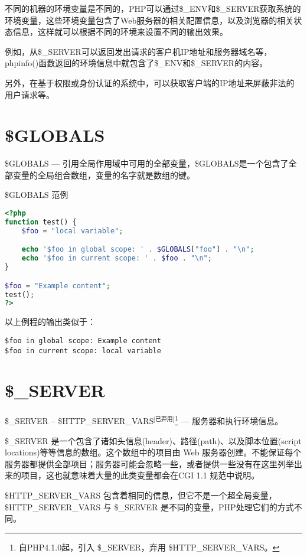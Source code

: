 不同的机器的环境变量是不同的，PHP可以通过\$\_ENV和\$\_SERVER获取系统的环境变量，这些环境变量包含了Web服务器的相关配置信息，以及浏览器的相关状态信息，这样就可以根据不同的环境来设置不同的输出效果。

例如，从\$\_SERVER可以返回发出请求的客户机IP地址和服务器域名等，phpinfo()函数返回的环境信息中就包含了\$\_ENV和\$\_SERVER的内容。


另外，在基于权限或身份认证的系统中，可以获取客户端的IP地址来屏蔽非法的用户请求等。




\section{\$GLOBALS}

\$GLOBALS — 引用全局作用域中可用的全部变量，\$GLOBALS是一个包含了全部变量的全局组合数组，变量的名字就是数组的键。


\begin{example}
\$GLOBALS 范例
\begin{lstlisting}[language=PHP]
<?php
function test() {
    $foo = "local variable";

    echo '$foo in global scope: ' . $GLOBALS["foo"] . "\n";
    echo '$foo in current scope: ' . $foo . "\n";
}

$foo = "Example content";
test();
?>
\end{lstlisting}
\end{example}

以上例程的输出类似于：

\begin{verbatim}
$foo in global scope: Example content
$foo in current scope: local variable
\end{verbatim}


\section{\$\_SERVER}


\$\_SERVER -- \$HTTP\_SERVER\_VARS$^{\text{[已弃用]}}$\footnote{自PHP4.1.0起，引入 \$\_SERVER，弃用 \$HTTP\_SERVER\_VARS。} — 服务器和执行环境信息。

\$\_SERVER 是一个包含了诸如头信息(header)、路径(path)、以及脚本位置(script locations)等等信息的数组。这个数组中的项目由 Web 服务器创建。不能保证每个服务器都提供全部项目；服务器可能会忽略一些，或者提供一些没有在这里列举出来的项目，这也就意味着大量的此类变量都会在CGI 1.1 规范中说明。

\$HTTP\_SERVER\_VARS 包含着相同的信息，但它不是一个超全局变量，\$HTTP\_SERVER\_VARS 与 \$\_SERVER 是不同的变量，PHP处理它们的方式不同。


